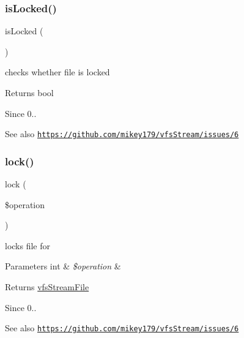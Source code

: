 \subsubsection{\texorpdfstring{is\+Locked()}{isLocked()}}
{\footnotesize\ttfamily is\+Locked (\begin{DoxyParamCaption}{ }\end{DoxyParamCaption})}

checks whether file is locked

\begin{DoxyReturn}{Returns}
bool 
\end{DoxyReturn}
\begin{DoxySince}{Since}
0.. 
\end{DoxySince}
\begin{DoxySeeAlso}{See also}
\href{https://github.com/mikey179/vfsStream/issues/6}{\tt https\+://github.\+com/mikey179/vfs\+Stream/issues/6} 
\end{DoxySeeAlso}
\mbox{\label{classorg_1_1bovigo_1_1vfs_1_1vfs_stream_file_af3e43f76e3c009eed74a75862b67f04e}} 
\subsubsection{\texorpdfstring{lock()}{lock()}}
{\footnotesize\ttfamily lock (\begin{DoxyParamCaption}\item[{}]{\$operation }\end{DoxyParamCaption})}

locks file for


\begin{DoxyParams}[1]{Parameters}
int & {\em \$operation} & \\
\hline
\end{DoxyParams}
\begin{DoxyReturn}{Returns}
\mbox{\hyperlink{classorg_1_1bovigo_1_1vfs_1_1vfs_stream_file}{vfs\+Stream\+File}} 
\end{DoxyReturn}
\begin{DoxySince}{Since}
0.. 
\end{DoxySince}
\begin{DoxySeeAlso}{See also}
\href{https://github.com/mikey179/vfsStream/issues/6}{\tt https\+://github.\+com/mikey179/vfs\+Stream/issues/6} 
\end{DoxySeeAlso}
\mbox{\label{classorg_1_1bovigo_1_1vfs_1_1vfs_stream_file_a44a2ac59a3b91f8c18905dce700934d6}} 
